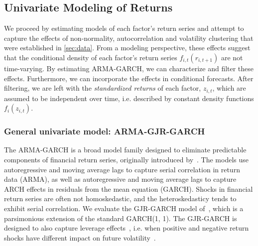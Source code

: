 
\subsection{Univariate Modeling of Returns} %
\label{sub:univariate_modeling_of_returns}

We proceed by estimating models of each factor's return series and attempt to capture the effects of non-normality, autocorrelation and volatility clustering that were established in \autoref{sec:data}. From a modeling perspective, these effects suggest that the conditional density of each factor's return series $f_{i,t}(r_{i,t+1})$ are not time-varying. By estimating ARMA-GARCH, we can characterize and filter these effects. Furthermore, we can incorporate the effects in conditional forecasts. After filtering, we are left with the \emph{standardized returns} of each factor, $z_{i,t}$, which are assumed to be independent over time, i.e. described by constant density functions $f_i(z_{i,t})$.

\subsubsection{General univariate model: ARMA-GJR-GARCH}

The ARMA-GARCH is a broad model family designed to eliminate predictable components of financial return series, originally introduced by~\textcite{Bollerslev1986}. The models use autoregressive and moving average lags to capture serial correlation in return data (ARMA), as well as autoregressive and moving average lags to capture ARCH effects in residuals from the mean equation (GARCH). Shocks in financial return series are often not homoskedastic, and the heteroskedasticy tends to exhibit serial correlation. We evaluate the GJR-GARCH model of~\textcite{glosten1993relation}, which is a parsimonious extension of the standard GARCH(1, 1). The GJR-GARCH is designed to also capture leverage effects~\autocite{glosten1993relation}, i.e. when positive and negative return shocks have different impact on future volatility~\autocite{Black1976}.

